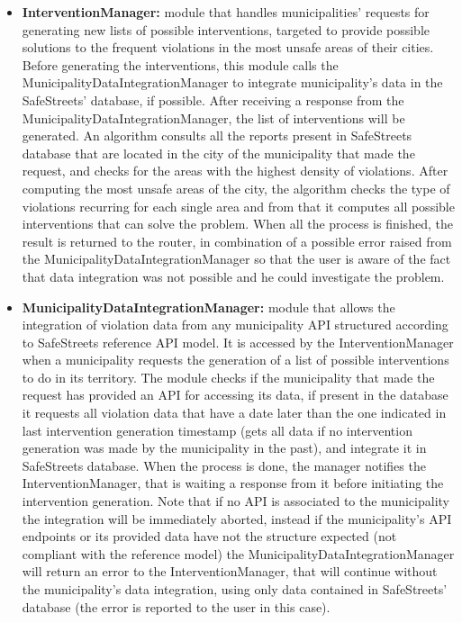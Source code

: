 \begin{itemize}
	\item \textbf{InterventionManager:}
	module that handles municipalities' requests for generating new lists of possible interventions, targeted to provide possible solutions to the frequent violations in the most unsafe areas of their cities. Before generating the interventions, this module calls the MunicipalityDataIntegrationManager to integrate municipality's data in the SafeStreets' database, if possible. After receiving a response from the MunicipalityDataIntegrationManager, the list of interventions will be generated. An algorithm consults all the reports present in SafeStreets database that are located in the city of the municipality that made the request, and checks for the areas with the highest density of violations. After computing the most unsafe areas of the city, the algorithm checks the type of violations recurring for each single area and from that it computes all possible interventions that can solve the problem. When all the process is finished, the result is returned to the router, in combination of a possible error raised from the MunicipalityDataIntegrationManager so that the user is aware of the fact that data integration was not possible and he could investigate the problem.
	\item \textbf{MunicipalityDataIntegrationManager:}
	module that allows the integration of violation data from any municipality API structured according to SafeStreets reference API model. It is accessed by the InterventionManager when a municipality requests the generation of a list of possible interventions to do in its territory. The module checks if the municipality that made the request has provided an API for accessing its data, if present in the database it requests all violation data that have a date later than the one indicated in last intervention generation timestamp (gets all data if no intervention generation was made by the municipality in the past), and integrate it in SafeStreets database. When the process is done, the manager notifies the InterventionManager, that is waiting a response from it before initiating the intervention generation. Note that if no API is associated to the municipality the integration will be immediately aborted, instead if the municipality's API endpoints or its provided data have not the structure expected (not compliant with the reference model) the MunicipalityDataIntegrationManager will return an error to the InterventionManager, that will continue without the municipality's data integration, using only data contained in SafeStreets' database (the error is reported to the user in this case).
\end{itemize}


